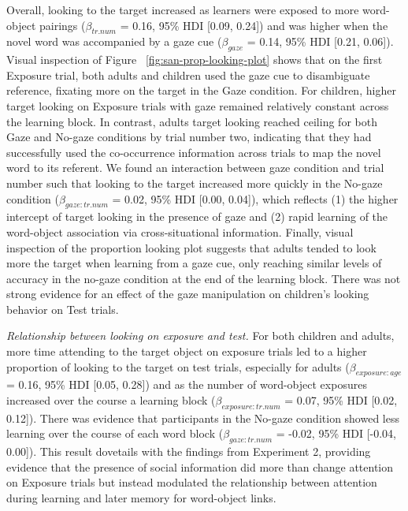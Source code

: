 \documentclass[man,floatsintext]{apa6}
\begin{document}
Overall, looking to the target increased as learners were exposed to
more word-object pairings (\(\beta_{tr.num}\) = 0.16, 95\% HDI {[}0.09,
0.24{]}) and was higher when the novel word was accompanied by a gaze
cue (\(\beta_{gaze}\) = 0.14, 95\% HDI {[}0.21, 0.06{]}). Visual
inspection of Figure ~\ref{fig:san-prop-looking-plot} shows that on the
first Exposure trial, both adults and children used the gaze cue to
disambiguate reference, fixating more on the target in the Gaze
condition. For children, higher target looking on Exposure trials with
gaze remained relatively constant across the learning block. In
contrast, adults target looking reached ceiling for both Gaze and
No-gaze conditions by trial number two, indicating that they had
successfully used the co-occurrence information across trials to map the
novel word to its referent. We found an interaction between gaze
condition and trial number such that looking to the target increased
more quickly in the No-gaze condition (\(\beta_{gaze:tr.num}\) = 0.02,
95\% HDI {[}0.00, 0.04{]}), which reflects (1) the higher intercept of
target looking in the presence of gaze and (2) rapid learning of the
word-object association via cross-situational information. Finally,
visual inspection of the proportion looking plot suggests that adults
tended to look more the target when learning from a gaze cue, only
reaching similar levels of accuracy in the no-gaze condition at the end
of the learning block. There was not strong evidence for an effect of
the gaze manipulation on children's looking behavior on Test trials.

\emph{Relationship between looking on exposure and test.} For both
children and adults, more time attending to the target object on
exposure trials led to a higher proportion of looking to the target on
test trials, especially for adults (\(\beta_{exposure:age}\) = 0.16,
95\% HDI {[}0.05, 0.28{]}) and as the number of word-object exposures
increased over the course a learning block (\(\beta_{exposure:tr.num}\)
= 0.07, 95\% HDI {[}0.02, 0.12{]}). There was evidence that participants
in the No-gaze condition showed less learning over the course of each
word block (\(\beta_{gaze:tr.num}\) = -0.02, 95\% HDI {[}-0.04,
0.00{]}). This result dovetails with the findings from Experiment 2,
providing evidence that the presence of social information did more than
change attention on Exposure trials but instead modulated the
relationship between attention during learning and later memory for
word-object links.
\end{document}
